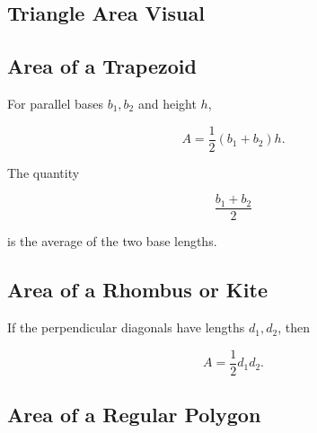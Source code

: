 \subsection{Triangle Area Visual}
\label{subsec:triangle-area-visual}

\begin{centereddiagram}
\end{centereddiagram}

\subsection{Area of a Trapezoid}
\label{subsec:trapezoid-area}

For parallel bases \(b_1,b_2\) and height \(h\),

\[ \boxed{A=\frac12(b_1+b_2)h.} \]

The quantity

\[ \frac{b_1+b_2}{2} \]

is the average of the two base lengths.

\subsection{Area of a Rhombus or Kite}
\label{subsec:rhombus-kite-area}

If the perpendicular diagonals have lengths \(d_1,d_2\), then

\[ \boxed{A=\frac12d_1d_2.} \]

\subsection{Area of a Regular Polygon}
\label{subsec:regular-polygon-area}

